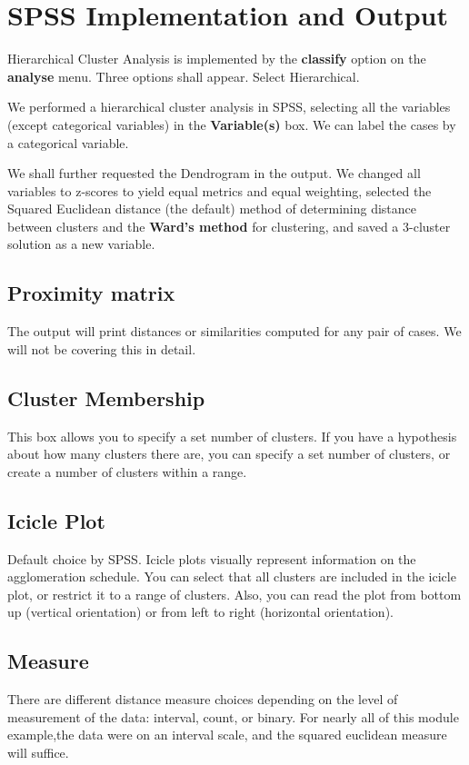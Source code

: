 \documentclass[a4paper,12pt]{article}
\begin{document}
\section{SPSS Implementation and Output}

Hierarchical Cluster Analysis is implemented by the \textbf{classify} option on the \textbf{analyse} menu.
Three options shall appear. Select Hierarchical.

We performed a hierarchical cluster analysis in SPSS, selecting all the variables (except categorical variables) in the \textbf{Variable(s)} box. We can label the cases by a categorical variable. 

We shall further requested the Dendrogram in the output. We changed all
variables to z-scores to yield equal metrics and equal weighting, selected the Squared Euclidean distance
(the default) method of determining distance between clusters and the \textbf{Ward's method} for
clustering, and saved a 3-cluster solution as a new variable.

\subsection{Proximity matrix}
The output will print distances or similarities computed for any pair of cases. We will not be covering this in detail.

\subsection{Cluster Membership}
This box allows you to specify a set number of clusters. If you have a
hypothesis about how many clusters there are, you can specify a set number of clusters, or
create a number of clusters within a range.

\subsection{Icicle Plot} Default choice by SPSS. Icicle plots visually represent information on the agglomeration
schedule. You can select that all clusters are included in the icicle plot, or restrict it to a range of
clusters. Also, you can read the plot from bottom up (vertical orientation) or from left to right
(horizontal orientation).

\subsection{Measure} There are different distance measure choices depending on the level of measurement
of the data: interval, count, or binary.
For nearly all of this module example,the data were on an interval scale, and the squared euclidean measure will suffice.
\end{document}
